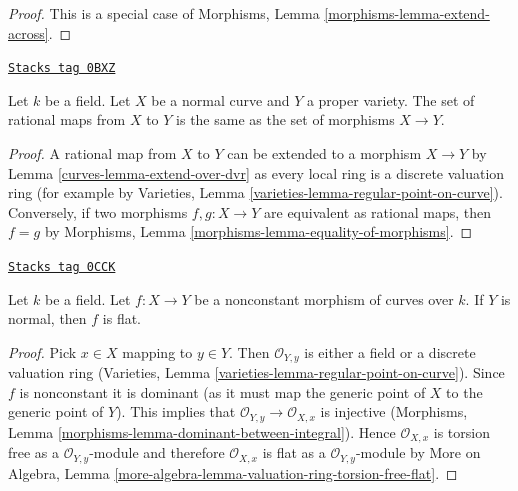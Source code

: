 \begin{proof}
This is a special case of
Morphisms, Lemma \ref{morphisms-lemma-extend-across}.
\end{proof}

\begin{lemma}
\label{curves-lemma-extend-over-normal-curve}
\href{https://stacks.math.columbia.edu/tag/0BXZ}{\texttt{Stacks tag 0BXZ}}

Let $k$ be a field. Let $X$ be a normal curve and $Y$ a proper variety.
The set of rational maps from $X$ to $Y$ is the same as the set
of morphisms $X \to Y$.
\end{lemma}

\begin{proof}

A rational map from $X$ to $Y$ can be extended to a morphism $X \to Y$
by Lemma \ref{curves-lemma-extend-over-dvr}
as every local ring is a discrete valuation ring
(for example by Varieties, Lemma \ref{varieties-lemma-regular-point-on-curve}).
Conversely, if two morphisms $f,g: X \to Y$ are equivalent as rational maps,
then  $f = g$ by Morphisms, Lemma \ref{morphisms-lemma-equality-of-morphisms}.
\end{proof}

\begin{lemma}[Flat]
\label{curves-lemma-flat}
\href{https://stacks.math.columbia.edu/tag/0CCK}{\texttt{Stacks tag 0CCK}}

Let $k$ be a field. Let $f : X \to Y$ be a nonconstant morphism
of curves over $k$. If $Y$ is normal, then $f$ is flat.
\end{lemma}

\begin{proof}
Pick $x \in X$ mapping to $y \in Y$. Then $\mathcal{O}_{Y, y}$ is either a
field or a discrete valuation ring
(Varieties, Lemma \ref{varieties-lemma-regular-point-on-curve}).
Since $f$ is nonconstant it is dominant (as it must map the
generic point of $X$ to the generic point of $Y$). This implies that
$\mathcal{O}_{Y, y} \to \mathcal{O}_{X, x}$ is injective
(Morphisms, Lemma \ref{morphisms-lemma-dominant-between-integral}).
Hence $\mathcal{O}_{X, x}$ is torsion free as a $\mathcal{O}_{Y, y}$-module
and therefore $\mathcal{O}_{X, x}$ is flat as a $\mathcal{O}_{Y, y}$-module
by More on Algebra, Lemma
\ref{more-algebra-lemma-valuation-ring-torsion-free-flat}.
\end{proof}


